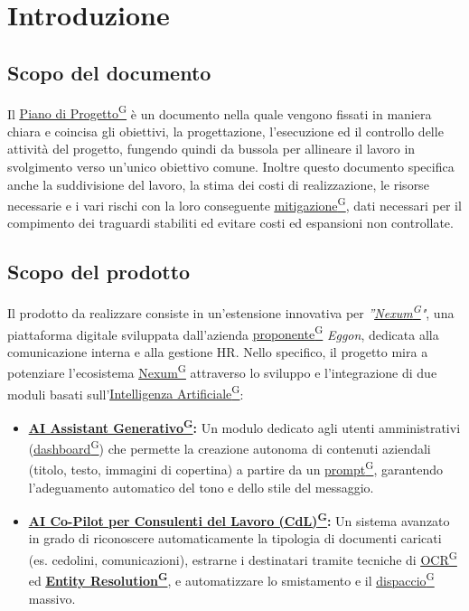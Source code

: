 \documentclass[a4paper,12pt]{article}
\providecommand{\glslink}[2]{\href{https://alittlebyte-19.github.io/Documentazione/glossario.html\#gls-#1}{\underline{#2}\textsuperscript{\scriptsize G}}}
\begin{document}
\newpage
{}
\setcounter{page}{1}
\newpage

\tableofcontents
\listoftables
\listoffigures

\newpage

\section{Introduzione}
\label{sec:introduzione}

\subsection{Scopo del documento}
\label{sec:scopo_del_documento}
Il \glslink{piano-di-progetto}{Piano di Progetto} è un documento nella quale vengono fissati in maniera chiara e coincisa gli obiettivi, la progettazione, l'esecuzione ed il controllo delle attività del progetto, fungendo quindi da bussola per allineare il lavoro in svolgimento verso un'unico obiettivo comune.
Inoltre questo documento specifica anche la suddivisione del lavoro, la stima dei costi di realizzazione, le risorse necessarie e i vari rischi con la loro conseguente \glslink{mitigazione-dei-rischi}{mitigazione}, dati necessari per il compimento dei traguardi stabiliti ed evitare costi ed espansioni non controllate.


\subsection{Scopo del prodotto}
\label{sec:scopo_del_prodotto}
Il prodotto da realizzare consiste in un'estensione innovativa per \textit{''\glslink{nexum}{Nexum}"}, una piattaforma digitale sviluppata dall'azienda \glslink{committente-proponente}{proponente} \textit{Eggon}, dedicata alla comunicazione interna e alla gestione HR.
Nello specifico, il progetto mira a potenziare l'ecosistema \glslink{nexum}{Nexum} attraverso lo sviluppo e l'integrazione di due moduli basati sull'\glslink{intelligenza-artificiale-ai}{Intelligenza Artificiale}:
\begin{itemize}
    \item \textbf{\glslink{ai-assistant-generativo}{AI Assistant Generativo}:} Un modulo dedicato agli utenti amministrativi (\glslink{dashboard}{dashboard}) che permette la creazione autonoma di contenuti aziendali (titolo, testo, immagini di copertina) a partire da un \glslink{prompt}{prompt}, garantendo l'adeguamento automatico del tono e dello stile del messaggio.
    \item \textbf{\glslink{ai-co-pilot-per-consulenti-del-lavoro-cdl}{AI Co-Pilot per Consulenti del Lavoro (CdL)}:} Un sistema avanzato in grado di riconoscere automaticamente la tipologia di documenti caricati (es. cedolini, comunicazioni), estrarne i destinatari tramite tecniche di \glslink{ocr-riconoscimento-ottico-dei-caratteri}{OCR} ed \textbf{\glslink{entity-resolution}{Entity Resolution}}, e automatizzare lo smistamento e il \glslink{dispaccio}{dispaccio} massivo.
\end{itemize}
\end{document}
